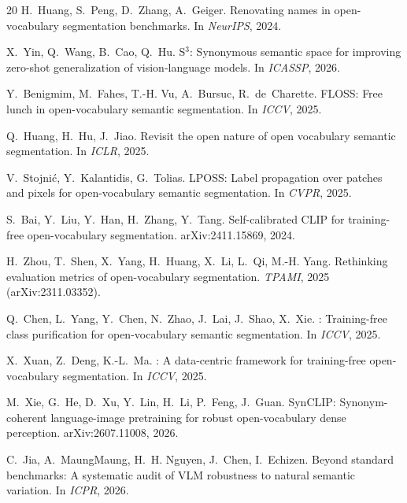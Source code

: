 \documentclass[11pt]{article}
\begin{document}
\begin{thebibliography}{20}
H.~Huang, S.~Peng, D.~Zhang, A.~Geiger.
\newblock Renovating names in open-vocabulary segmentation benchmarks.
\newblock In \emph{NeurIPS}, 2024.

X.~Yin, Q.~Wang, B.~Cao, Q.~Hu.
\newblock S$^3$: Synonymous semantic space for improving zero-shot generalization of vision-language models.
\newblock In \emph{ICASSP}, 2026.

Y.~Benigmim, M.~Fahes, T.-H. Vu, A.~Bursuc, R.~de~Charette.
\newblock FLOSS: Free lunch in open-vocabulary semantic segmentation.
\newblock In \emph{ICCV}, 2025.

Q.~Huang, H.~Hu, J.~Jiao.
\newblock Revisit the open nature of open vocabulary semantic segmentation.
\newblock In \emph{ICLR}, 2025.

V.~Stojni\'c, Y.~Kalantidis, G.~Tolias.
\newblock LPOSS: Label propagation over patches and pixels for open-vocabulary
  semantic segmentation.
\newblock In \emph{CVPR}, 2025.

S.~Bai, Y.~Liu, Y.~Han, H.~Zhang, Y.~Tang.
\newblock Self-calibrated CLIP for training-free open-vocabulary
  segmentation.
\newblock arXiv:2411.15869, 2024.

H.~Zhou, T.~Shen, X.~Yang, H.~Huang, X.~Li, L.~Qi, M.-H. Yang.
\newblock Rethinking evaluation metrics of open-vocabulary segmentation.
\newblock \emph{TPAMI}, 2025 (arXiv:2311.03352).

Q.~Chen, L.~Yang, Y.~Chen, N.~Zhao, J.~Lai, J.~Shao, X.~Xie.
: Training-free class purification for open-vocabulary
  semantic segmentation.
\newblock In \emph{ICCV}, 2025.

X.~Xuan, Z.~Deng, K.-L.~Ma.
: A data-centric framework for training-free open-vocabulary
  segmentation.
\newblock In \emph{ICCV}, 2025.

M.~Xie, G.~He, D.~Xu, Y.~Lin, H.~Li, P.~Feng, J.~Guan.
\newblock SynCLIP: Synonym-coherent language-image pretraining for robust
  open-vocabulary dense perception.
\newblock arXiv:2607.11008, 2026.

C.~Jia, A.~MaungMaung, H.~H. Nguyen, J.~Chen, I.~Echizen.
\newblock Beyond standard benchmarks: A systematic audit of VLM robustness to
  natural semantic variation.
\newblock In \emph{ICPR}, 2026.


\end{thebibliography}
\end{document}
